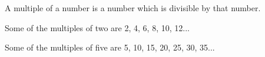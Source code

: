 A multiple of a number is a number which is divisible by that number.
\par
Some of the multiples of two are 2, 4, 6, 8, 10, 12...
\par
Some of the multiples of five are 5, 10, 15, 20, 25, 30, 35...